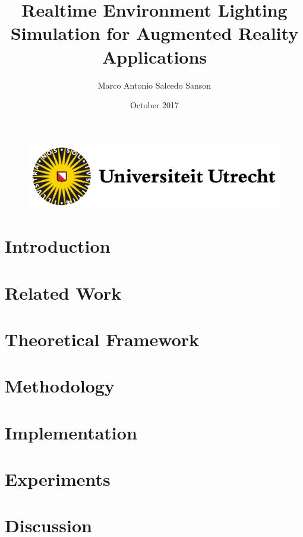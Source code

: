 \documentclass{report}
\title{Realtime Environment Lighting Simulation for Augmented Reality Applications}
\author{Marco Antonio Salcedo Sanson }
\date{October 2017}
\begin{document}
\begin{figure}[t]
\includegraphics[scale = 0.5]{Figures/uu-logo.png}
\end{figure}

\maketitle
\clearpage

\tableofcontents{}
\clearpage

\chapter{Introduction} \label{introduction}



\chapter{Related Work} \label{related}


\chapter{Theoretical Framework} \label{theory}


\chapter{Methodology} \label{method}


\chapter{Implementation} \label{implementation}


\chapter{Experiments} \label{experiments}


\chapter{Discussion} \label{discussion}


\clearpage


\nocite{*}

\end{document}
